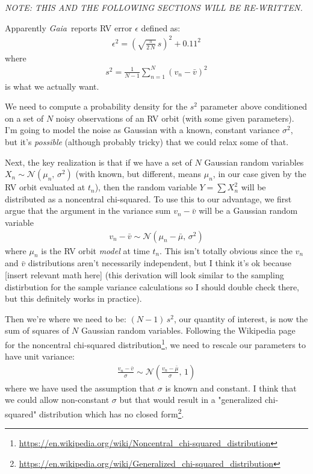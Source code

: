 \documentclass[modern, letterpaper]{aastex631}
\newcommand{\project}[1]{\textsl{#1}}
\newcommand{\Gaia}{\project{Gaia}}
\begin{document}
\noindent
\emph{NOTE: THIS AND THE FOLLOWING SECTIONS WILL BE RE-WRITTEN.}

Apparently \Gaia\ reports RV error $\epsilon$ defined as:
\begin{eqnarray}
	\epsilon^2 = \left(\sqrt{\frac{\pi}{2\,N}}\,s\right)^2 + 0.11^2
\end{eqnarray}
where
\begin{eqnarray}
	s^2 = \frac{1}{N-1}\sum_{n=1}^N \left(v_n - \bar{v}\right)^2
\end{eqnarray}
is what we actually want.

We need to compute a probability density for the $s^2$ parameter above conditioned on a set of $N$ noisy observations of an RV orbit (with some given parameters).
I'm going to model the noise as Gaussian with a known, constant variance $\sigma^2$, but it's \emph{possible} (although probably tricky) that we could relax some of that.

Next, the key realization is that if we have a set of $N$ Gaussian random variables $X_n \sim \mathcal{N}\left(\mu_n,\,\sigma^2\right)$ (with known, but different, means $\mu_n$, in our case given by the RV orbit evaluated at $t_n$), then the random variable $Y = \sum X_n^2$ will be distributed as a noncentral chi-squared.
To use this to our advantage, we first argue that the argument in the variance sum $v_n - \bar{v}$ will be a Gaussian random variable
\begin{eqnarray}
	v_n - \bar{v} \sim \mathcal{N}\left(\mu_n - \bar{\mu},\,\sigma^2\right)
\end{eqnarray}
where $\mu_n$ is the RV orbit \emph{model} at time $t_n$.
This isn't totally obvious since the $v_n$ and $\bar{v}$ distributions aren't necessarily independent, but I think it's ok because [insert relevant math here] (this derivation will look similar to the sampling distirbution for the sample variance calculations so I should double check there, but this definitely works in practice).

Then we're where we need to be: $(N - 1)\,s^2$, our quantity of interest, is now the sum of squares of $N$ Gaussian random variables.
Following the Wikipedia page for the noncentral chi-squared distribution\footnote{\url{https://en.wikipedia.org/wiki/Noncentral_chi-squared_distribution}}, we need to rescale our parameters to have unit variance:
\begin{eqnarray}
	\frac{v_n - \bar{v}}{\sigma} \sim \mathcal{N}\left(\frac{v_n - \bar{\mu}}{\sigma},\,1\right)
\end{eqnarray}
where we have used the assumption that $\sigma$ is known and constant.
I think that we could allow non-constant $\sigma$ but that would result in a "generalized chi-squared" distribution which has no closed form\footnote{\url{https://en.wikipedia.org/wiki/Generalized_chi-squared_distribution}}.
\end{document}
